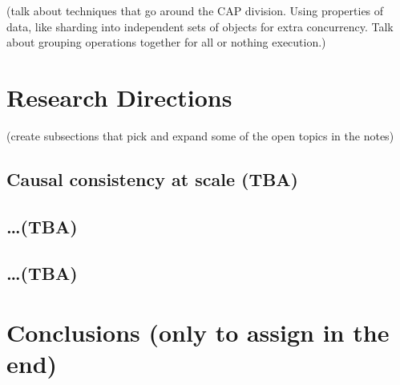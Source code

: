 \documentclass[
graybox,
envcountchap,
]{svmult}
\begin{document}
\begin{bibunit}
        (talk about techniques that go around the CAP division. Using properties of data, like sharding into independent sets of objects for extra concurrency. Talk about grouping operations together for all or nothing execution.)

        \section{Research Directions}\label{sec:2}

        (create subsections that pick and expand some of the open topics in the notes)

        \subsection{Causal consistency at scale (TBA)}

        \subsection{\ldots (TBA)}

        \subsection{\ldots (TBA)}


        \section{Conclusions (only to assign in the end)}\label{sec:2}


\end{bibunit}
\end{document}
